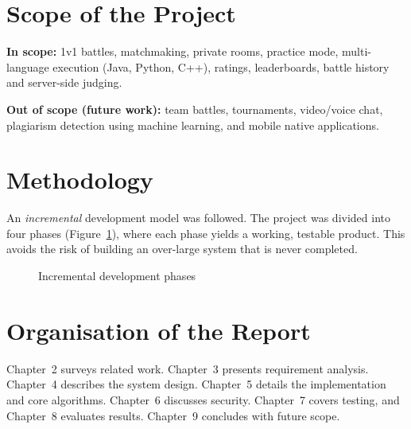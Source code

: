 \documentclass[12pt,a4paper,oneside]{report}
\begin{document}
\section{Scope of the Project}
\textbf{In scope:} 1v1 battles, matchmaking, private rooms, practice mode, multi-language execution
(Java, Python, C++), ratings, leaderboards, battle history and server-side judging.

\textbf{Out of scope (future work):} team battles, tournaments, video/voice chat, plagiarism detection using
machine learning, and mobile native applications.

\section{Methodology}
An \emph{incremental} development model was followed. The project was divided into four phases
(Figure~\ref{fig:phases}), where each phase yields a working, testable product. This avoids the risk of
building an over-large system that is never completed.

\begin{figure}[H]
\centering
{}
\caption{Incremental development phases}
\label{fig:phases}
\end{figure}

\section{Organisation of the Report}
Chapter~2 surveys related work. Chapter~3 presents requirement analysis. Chapter~4 describes the system
design. Chapter~5 details the implementation and core algorithms. Chapter~6 discusses security.
Chapter~7 covers testing, and Chapter~8 evaluates results. Chapter~9 concludes with future scope.
\end{document}
